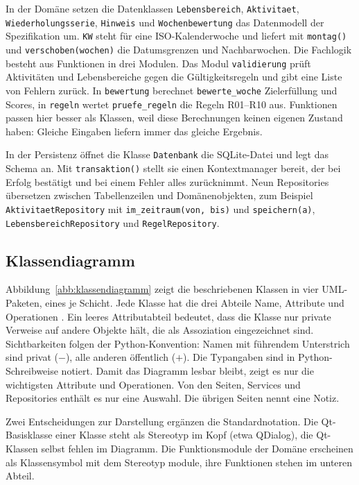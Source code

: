 In der Domäne setzen die Datenklassen \texttt{Lebensbereich}, \texttt{Aktivitaet}, \texttt{Wiederholungsserie}, \texttt{Hinweis} und \texttt{Wochenbewertung} das Datenmodell der Spezifikation um. \texttt{KW} steht für eine ISO-Kalenderwoche und liefert mit \texttt{montag()} und \texttt{verschoben(wochen)} die Datumsgrenzen und Nachbarwochen. Die Fachlogik besteht aus Funktionen in drei Modulen. Das Modul \texttt{validierung} prüft Aktivitäten und Lebensbereiche gegen die Gültigkeitsregeln und gibt eine Liste von Fehlern zurück. In \texttt{bewertung} berechnet \texttt{bewerte\_woche} Zielerfüllung und Scores, in \texttt{regeln} wertet \texttt{pruefe\_regeln} die Regeln R01--R10 aus. Funktionen passen hier besser als Klassen, weil diese Berechnungen keinen eigenen Zustand haben: Gleiche Eingaben liefern immer das gleiche Ergebnis.

In der Persistenz öffnet die Klasse \texttt{Datenbank} die SQLite-Datei und legt das Schema an. Mit \texttt{transaktion()} stellt sie einen Kontextmanager bereit, der bei Erfolg bestätigt und bei einem Fehler alles zurücknimmt. Neun Repositories übersetzen zwischen Tabellenzeilen und Domänenobjekten, zum Beispiel \texttt{AktivitaetRepository} mit \texttt{im\_zeitraum(von, bis)} und \texttt{speichern(a)}, \texttt{LebensbereichRepository} und \texttt{RegelRepository}.

\subsection{Klassendiagramm}
Abbildung~\ref{abb:klassendiagramm} zeigt die beschriebenen Klassen in vier \ac{UML}-Paketen, eines je Schicht. Jede Klasse hat die drei Abteile Name, Attribute und Operationen \parencite[S.~195]{omg2017uml}. Ein leeres Attributabteil bedeutet, dass die Klasse nur private Verweise auf andere Objekte hält, die als Assoziation eingezeichnet sind. Sichtbarkeiten folgen der Python-Konvention: Namen mit führendem Unterstrich sind privat ($-$), alle anderen öffentlich ($+$). Die Typangaben sind in Python-Schreibweise notiert. Damit das Diagramm lesbar bleibt, zeigt es nur die wichtigsten Attribute und Operationen. Von den Seiten, Services und Repositories enthält es nur eine Auswahl. Die übrigen Seiten nennt eine Notiz.

Zwei Entscheidungen zur Darstellung ergänzen die Standardnotation. Die Qt-Basisklasse einer Klasse steht als Stereotyp im Kopf (etwa \guillemotleft QDialog\guillemotright), die Qt-Klassen selbst fehlen im Diagramm. Die Funktionsmodule der Domäne erscheinen als Klassensymbol mit dem Stereotyp \guillemotleft module\guillemotright, ihre Funktionen stehen im unteren Abteil.

